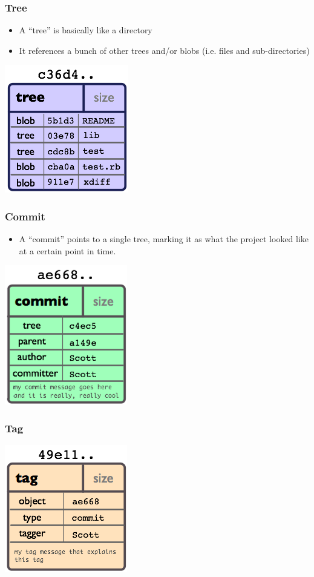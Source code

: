\documentclass{beamer}
\begin{document}
\begin{frame}
    \frametitle{Tree}
    \begin{itemize}
      \item A ``tree'' is basically like a directory 
      \item It references a bunch of other trees and/or blobs (i.e. files and sub-directories)
    \end{itemize}
    \includegraphics{images/object-tree.png}
\end{frame}

\begin{frame}
    \frametitle{Commit}
    \begin{itemize}
      \item A ``commit'' points to a single tree, marking it as what the project looked like at a certain point in time. 
    \end{itemize}
    \includegraphics{images/object-commit.png}
\end{frame}

\begin{frame}
    \frametitle{Tag}
    \includegraphics{images/object-tag.png}
\end{frame}
\end{document}
